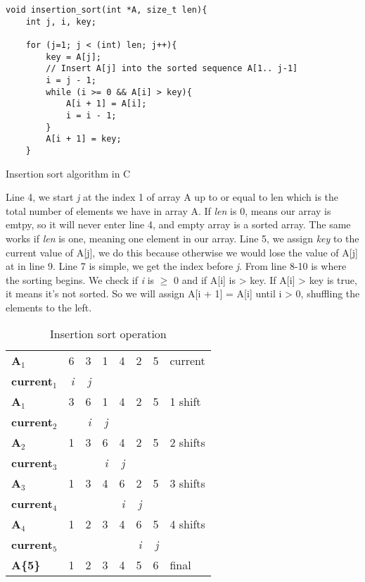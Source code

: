 \documentclass[11pt]{article}
\begin{document}
\begin{listing}[H]
\begin{verbatim}
void insertion_sort(int *A, size_t len){
    int j, i, key;

    for (j=1; j < (int) len; j++){
        key = A[j];
        // Insert A[j] into the sorted sequence A[1.. j-1]
        i = j - 1;
        while (i >= 0 && A[i] > key){
            A[i + 1] = A[i];
            i = i - 1;
        }
        A[i + 1] = key;
    }
\end{verbatim}
\caption{\label{c-ss}Insertion sort algorithm in C}
\end{listing}

Line 4, we start \emph{j} at the index 1 of array A up to or equal to len which is
the total number of elements we have in array A. If \emph{len} is 0, means our array
is emtpy, so it will never enter line 4, and empty array is a sorted array. The
same works if \emph{len} is one, meaning one element in our array. Line 5, we assign \emph{key} to the
current value of A[j], we do this because otherwise we would lose the value of
A[j] at in line 9. Line 7 is simple, we get the index before \emph{j}. From line 8-10
is where the sorting begins. We check if \emph{i} is $\ge$ 0 and if A[i] is > key. If
A[i] > key is true, it means it's not sorted. So we will assign A[i + 1] = A[i]
until i > 0, shuffling the elements to the left.

\begin{table}[htb]
\caption{Insertion sort operation}
\centering
\begin{tabular}{lrrrrrrl}
\textbf{A$_{\text{1}}$} & 6 & 3 & 1 & 4 & 2 & 5 & current\\
\textbf{current$_{\text{1}}$} & \emph{i} & \emph{j} &  &  &  &  & \\
\textbf{A$_{\text{1}}$} & 3 & 6 & 1 & 4 & 2 & 5 & 1 shift\\
\textbf{current$_{\text{2}}$} &  & \emph{i} & \emph{j} &  &  &  & \\
\textbf{A$_{\text{2}}$} & 1 & 3 & 6 & 4 & 2 & 5 & 2 shifts\\
\textbf{current$_{\text{3}}$} &  &  & \emph{i} & \emph{j} &  &  & \\
\textbf{A$_{\text{3}}$} & 1 & 3 & 4 & 6 & 2 & 5 & 3 shifts\\
\textbf{current$_{\text{4}}$} &  &  &  & \emph{i} & \emph{j} &  & \\
\textbf{A$_{\text{4}}$} & 1 & 2 & 3 & 4 & 6 & 5 & 4 shifts\\
\textbf{current$_{\text{5}}$} &  &  &  &  & \emph{i} & \emph{j} & \\
\textbf{A\{5\}} & 1 & 2 & 3 & 4 & 5 & 6 & final\\
\end{tabular}
\end{table}
\end{document}
